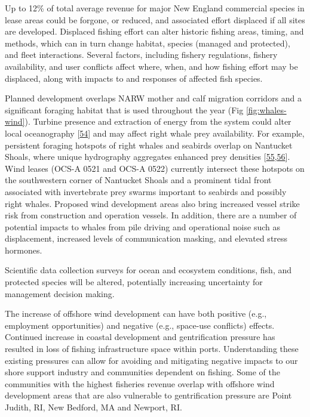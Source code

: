 \documentclass[
  10pt,
]{article}
\begin{document}
Up to 12\% of total average revenue for major New England commercial species in lease areas could be forgone, or reduced, and associated effort displaced if all sites are developed. Displaced fishing effort can alter historic fishing areas, timing, and methods, which can in turn change habitat, species (managed and protected), and fleet interactions. Several factors, including fishery regulations, fishery availability, and user conflicts affect where, when, and how fishing effort may be displaced, along with impacts to and responses of affected fish species.

Planned development overlaps NARW mother and calf migration corridors and a significant foraging habitat that is used throughout the year (Fig \ref{fig:whales-wind}). Turbine presence and extraction of energy from the system could alter local oceanography {[}\protect\hyperlink{ref-christiansen_wind_2022}{54}{]} and may affect right whale prey availability. For example, persistent foraging hotspots of right whales and seabirds overlap on Nantucket Shoals, where unique hydrography aggregates enhanced prey densities {[}\protect\hyperlink{ref-white_ducks_2020}{55},\protect\hyperlink{ref-sorochan_narw_forage_2021}{56}{]}. Wind leases (OCS-A 0521 and OCS-A 0522) currently intersect these hotspots on the southwestern corner of Nantucket Shoals and a prominent tidal front associated with invertebrate prey swarms important to seabirds and possibly right whales. Proposed wind development areas also bring increased vessel strike risk from construction and operation vessels. In addition, there are a number of potential impacts to whales from pile driving and operational noise such as displacement, increased levels of communication masking, and elevated stress hormones.

Scientific data collection surveys for ocean and ecosystem conditions, fish, and protected species will be altered, potentially increasing uncertainty for management decision making.

The increase of offshore wind development can have both positive (e.g., employment opportunities) and negative (e.g., space-use conflicts) effects. Continued increase in coastal development and gentrification pressure has resulted in loss of fishing infrastructure space within ports. Understanding these existing pressures can allow for avoiding and mitigating negative impacts to our shore support industry and communities dependent on fishing. Some of the communities with the highest fisheries revenue overlap with offshore wind development areas that are also vulnerable to gentrification pressure are Point Judith, RI, New Bedford, MA and Newport, RI.
\end{document}
